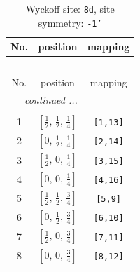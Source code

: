 \documentclass[fleqn,8pt]{jsarticle}
\begin{document}
\begin{longtable}{ccc}
\caption{Wyckoff site: {\tt 8d}, site symmetry: {\tt -1'}}
 \\
 \hline \hline
No. & position & mapping \\ \hline \endfirsthead

\multicolumn{2}{l}{\tablename\ \thetable{}} \\
 \hline \hline
No. & position & mapping \\ \hline \endhead

 \hline \hline
\multicolumn{2}{r}{\footnotesize\it continued ...} \\ \endfoot

 \hline \hline
\multicolumn{2}{r}{} \\ \endlastfoot

1 & $\left[ \frac{1}{2},\, \frac{1}{2},\, \frac{1}{4} \right]$ & {\tt [1,13]} \\ \hline
2 & $\left[ 0,\, \frac{1}{2},\, \frac{1}{4} \right]$ & {\tt [2,14]} \\ \hline
3 & $\left[ \frac{1}{2},\, 0,\, \frac{1}{4} \right]$ & {\tt [3,15]} \\ \hline
4 & $\left[ 0,\, 0,\, \frac{1}{4} \right]$ & {\tt [4,16]} \\ \hline
5 & $\left[ \frac{1}{2},\, \frac{1}{2},\, \frac{3}{4} \right]$ & {\tt [5,9]} \\ \hline
6 & $\left[ 0,\, \frac{1}{2},\, \frac{3}{4} \right]$ & {\tt [6,10]} \\ \hline
7 & $\left[ \frac{1}{2},\, 0,\, \frac{3}{4} \right]$ & {\tt [7,11]} \\ \hline
8 & $\left[ 0,\, 0,\, \frac{3}{4} \right]$ & {\tt [8,12]} \\
\end{longtable}
\renewcommand{\arraystretch}{1.2}
\end{document}
